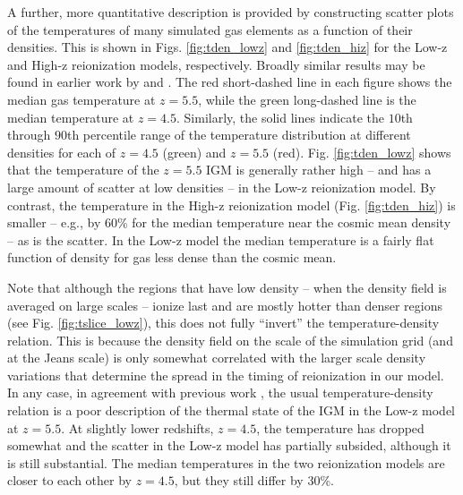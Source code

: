 A further, more quantitative description is provided by constructing 
scatter plots of the temperatures of many simulated gas elements
as a function of their densities. This is shown in Figs. \ref{fig:tden_lowz} and \ref{fig:tden_hiz} for the Low-z and
High-z reionization models, respectively. Broadly similar results may be found in earlier work by \citet{Trac:2008yz} and \citet{Furlanetto:2009kr}. The red short-dashed line in each figure shows the median gas temperature at $z=5.5$, while
the green long-dashed line is the median temperature at $z=4.5$. Similarly, the solid lines indicate the $10$th through $90$th percentile
range of the temperature distribution at different densities for each of $z=4.5$ (green) and $z=5.5$ (red). Fig. \ref{fig:tden_lowz}
shows that the temperature of the $z=5.5$ IGM is generally rather high -- and has a large amount of scatter at low
densities -- in the Low-z reionization model. By contrast, the temperature
in the High-z reionization model (Fig. \ref{fig:tden_hiz}) is smaller -- e.g., by 60\% for the median temperature near
the cosmic mean density  -- as is the scatter. In the Low-z model the median temperature is a fairly flat function of density
for gas less dense than the cosmic mean. 

Note that although the regions that have low density -- when the density field is averaged on large scales -- ionize last and are mostly
hotter than denser regions (see Fig. \ref{fig:tslice_lowz}), this does not fully ``invert'' the temperature-density relation. This is because the density field on the scale of the simulation grid (and at the Jeans scale) is
only somewhat correlated with the larger scale density variations that determine the spread in the timing of reionization
in our model. In any case, in agreement with previous work \citep{Trac:2008yz,Furlanetto:2009kr}, the usual temperature-density
relation is a poor description of the thermal state of the IGM in the Low-z model at $z=5.5$. 
At slightly lower redshifts, $z=4.5$, the temperature
has dropped somewhat and the scatter in the Low-z model has partially subsided, although it is still substantial. The median
temperatures in the two reionization models are closer to each other by $z=4.5$, but they still differ by 30\%. 


